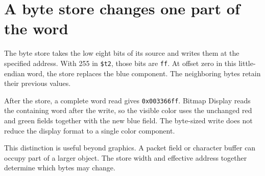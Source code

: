 \section{A byte store changes one part of the
  word}\label{002-single-pixel-p06-a-byte-store-changes-one-part-of-the-word}

The byte store takes the low eight bits of its source and writes them at
the specified address. With 255 in \texttt{\$t2}, those bits are
\texttt{ff}. At offset zero in this little-endian word, the store
replaces the blue component. The neighboring bytes retain their previous
values.

After the store, a complete word read gives \texttt{0x003366ff}. Bitmap
Display reads the containing word after the write, so the visible color
uses the unchanged red and green fields together with the new blue
field. The byte-sized write does not reduce the display format to a
single color component.

This distinction is useful beyond graphics. A packet field or character
buffer can occupy part of a larger object. The store width and effective
address together determine which bytes may change.
